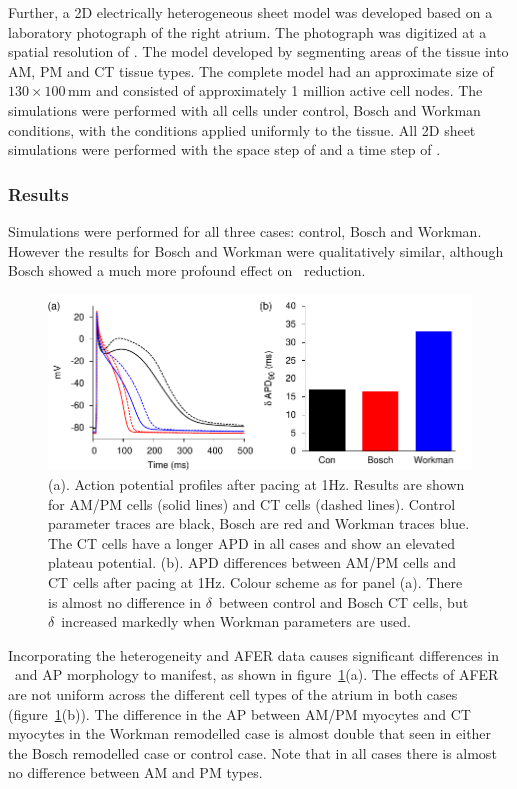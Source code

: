 Further, a 2D electrically heterogeneous sheet model was developed based on a
laboratory photograph of the right atrium.  The photograph was digitized at a
spatial resolution of . The model developed by segmenting areas of the
tissue into AM, PM and CT tissue types.  The complete model had an approximate size of
$130\times100\,\text{mm}$ and consisted of approximately 1 million active cell nodes.  The
simulations were performed with all cells under control, Bosch and Workman conditions,
with the conditions applied uniformly to the tissue.  All 2D sheet simulations
were performed with the space step of  and a time step of .

\subsubsection{Results}

Simulations were performed for all three cases: control, Bosch and Workman.
However the results for Bosch and Workman were qualitatively similar, although
Bosch showed a much more profound effect on \apd\ reduction.

\begin{figure}
\centering
\includegraphics{figures/toolkit/afer/figures/01_APD}
\caption[AFER AP Plots And APD differences]{
\label{fig:toolkit:afer:apd}
(a).
Action potential profiles after pacing at \unit{1}{Hz}.
Results are shown for AM/PM cells (solid lines) and CT cells (dashed lines).
Control parameter traces are black, Bosch are red and Workman traces
blue.
The CT cells have a longer APD in all cases and show an elevated plateau
potential.
(b).
APD differences between AM/PM cells and CT cells after pacing at \unit{1}{Hz}.
Colour scheme as for panel (a).
There is almost no difference in $\delta$\apd\ between control and Bosch CT cells,
but $\delta$\apd\ increased markedly when Workman parameters are used.
}
\end{figure}

Incorporating the heterogeneity and AFER data causes significant differences in
\apd\ and AP morphology to manifest, as shown in
figure~\ref{fig:toolkit:afer:apd}(a).
The effects of AFER are not uniform across the different cell types of the
atrium in both cases (figure~\ref{fig:toolkit:afer:apd}(b)).
The difference in the AP between AM/PM myocytes and CT myocytes in the Workman
remodelled case is almost double that seen in either the Bosch remodelled case
or control case.
Note that in all cases there is almost no difference between AM and PM types.


